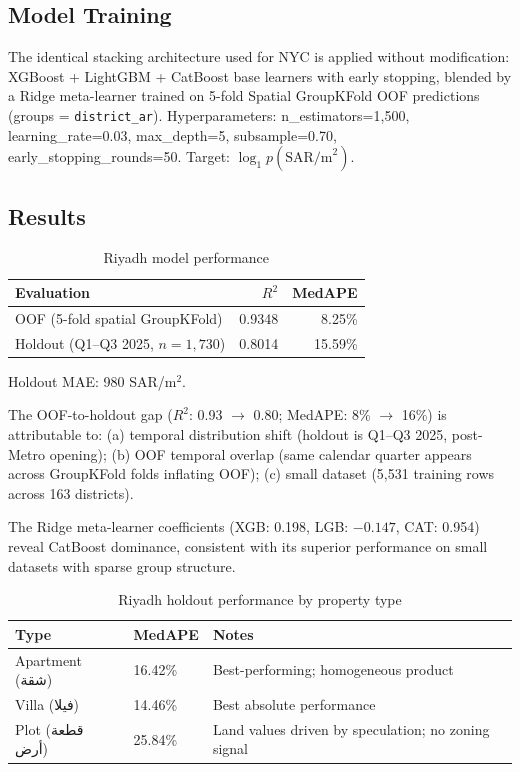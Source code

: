 \documentclass[11pt, a4paper, twoside]{article}
\begin{document}
\subsection{Model Training}
The identical stacking architecture used for NYC is applied without modification:
XGBoost + LightGBM + CatBoost base learners with early stopping, blended by a
Ridge meta-learner trained on 5-fold Spatial GroupKFold OOF predictions
(groups = \texttt{district\_ar}). Hyperparameters: n\_estimators=1,500,
learning\_rate=0.03, max\_depth=5, subsample=0.70, early\_stopping\_rounds=50.
Target: $\log_1p(\text{SAR/m}^2)$.

\subsection{Results}
\begin{table}[H]
  \centering
  \caption{Riyadh model performance}
  \label{tab:riyadh_perf}
  \begin{tabular}{lrr}
    \toprule
    Evaluation & $R^2$ & MedAPE \\
    \midrule
    OOF (5-fold spatial GroupKFold) & 0.9348 & 8.25\% \\
    Holdout (Q1--Q3 2025, $n=1{,}730$) & 0.8014 & 15.59\% \\
    \bottomrule
  \end{tabular}
  \par\smallskip\small Holdout MAE: 980 SAR/m$^2$.
\end{table}

The OOF-to-holdout gap ($R^2$: 0.93 $\to$ 0.80; MedAPE: 8\% $\to$ 16\%)
is attributable to: (a) temporal distribution shift (holdout is Q1--Q3 2025,
post-Metro opening); (b) OOF temporal overlap (same calendar quarter appears
across GroupKFold folds inflating OOF); (c) small dataset (5,531 training rows
across 163 districts).

The Ridge meta-learner coefficients (XGB: 0.198, LGB: $-0.147$, CAT: 0.954)
reveal CatBoost dominance, consistent with its superior performance on small
datasets with sparse group structure.

\begin{table}[H]
  \centering
  \caption{Riyadh holdout performance by property type}
  \label{tab:riyadh_type_perf}
  \begin{tabular}{llp{7cm}}
    \toprule
    Type & MedAPE & Notes \\
    \midrule
    Apartment (شقة) & 16.42\% & Best-performing; homogeneous product \\
    Villa (فيلا)    & 14.46\% & Best absolute performance \\
    Plot (قطعة أرض) & 25.84\% & Land values driven by speculation; no zoning signal \\
    \bottomrule
  \end{tabular}
\end{table}
\end{document}
